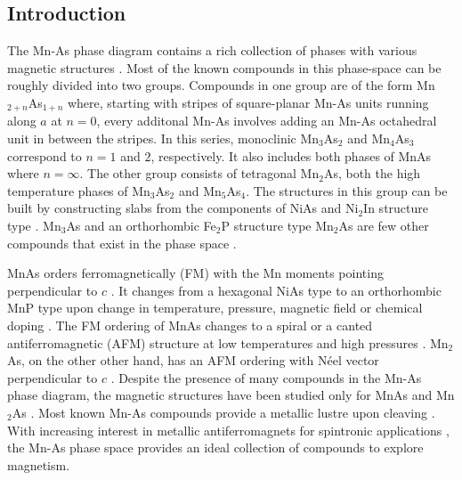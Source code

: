 \documentclass[10pt,doublespacing,edeposit]{uiucthesis2020}
\begin{document}
\begin{mainmatter}




\section{Introduction} 



The Mn-As phase diagram contains a rich collection of phases with various magnetic structures \cite{Bacon1955,Yuzuri1960,Carrillo-Cabrera1983,Dietrich1990,Moller1993,Hagedorn1994,Hagedorn1995}. Most of the known compounds in this phase-space can be roughly divided into two groups. Compounds in one group are of the form Mn$_{2+n}$As$_{1+n}$ where, starting with stripes of square-planar Mn-As units running along $a$ at $n=0$, every additonal Mn-As involves adding an Mn-As octahedral unit in between the stripes.
In this series, monoclinic Mn$_3$As$_2$ and Mn$_4$As$_3$ correspond to $n=1$ and $2$, respectively. 
It also includes both phases of MnAs where $n=\infty$. The other group consists of tetragonal Mn$_2$As, both the high temperature phases of Mn$_3$As$_2$ and Mn$_5$As$_4$. The structures in this group can be built by constructing slabs from the components of NiAs and Ni$_2$In structure type \cite{Hagedorn1995}. Mn$_3$As and an orthorhombic Fe$_2$P structure type Mn$_2$As are few other compounds that exist in the phase space \cite{Jeitschko1972,Carrillo-Cabrera1983}.

MnAs orders ferromagnetically (FM) with the Mn moments pointing perpendicular to $c$ \cite{Bacon1955}. It changes from a hexagonal NiAs type to an orthorhombic MnP type upon change in temperature, pressure, magnetic field or chemical doping \cite{Glazkov2003,Ishikawa2006,Sirota1971,Pytlik1985,Schwartz1971}. 
The FM ordering of MnAs changes to a spiral or a canted antiferromagnetic (AFM) structure at low temperatures and high pressures \cite{Bacon1955,Andresen1984,Glazkov2003}. 
Mn$_2$As, on the other other hand, has an AFM ordering with N\'eel vector perpendicular to $c$ \cite{Austin1962}.
Despite the presence of many compounds in the Mn-As phase diagram, the magnetic structures have been studied only for MnAs and Mn$_2$As \cite{Bacon1955,Austin1962}.
Most known Mn-As compounds provide a metallic lustre upon cleaving \cite{Hagedorn1995,Hagedorn1994,Dietrich1990,Moller1993}.
With increasing interest in metallic antiferromagnets for spintronic applications \cite{Baltz2018,Siddiqui2020,Jungfleisch2018}, the Mn-As phase space provides an ideal collection of compounds to explore magnetism.


\end{mainmatter}
\end{document}
